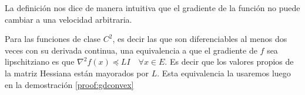 La definición nos dice de manera intuitiva que el gradiente de la función no puede cambiar a una velocidad arbitraria. %

Para las funciones de clase $C^2$, es decir las que son diferenciables al menos dos veces con su derivada continua, una equivalencia a que el gradiente de $f$ sea lipschitziano es que $\nabla^2 f(x) \preceq LI \quad \forall x \in E$. Es decir que los valores propios de la matriz Hessiana están mayorados por $L$. Esta equivalencia la usaremos luego en la demostración \ref{proof:gdconvex}

\begin{comment}
	
	\subsection{Convergencia}
	
	Sea ${a_n}$ una sucesión que converge a b, con $a_n \neq b \quad \forall n \in \mathbb{N}$.
	
	\begin{definicion}[Orden de convergencia]
	    Sean $\alpha>0$ y $\lambda>0$, si se verifica
	
	    $$\lim_{n\rightarrow \infty} \frac{|a_{n+1}-b|}{|a_n - b|^{\alpha}} = \lambda$$
	
	    Entonces decimos que la sucesión ${a_n}$ converge a b con orden de convergencia $\alpha$ y constante de error asintótica $\lambda$.
	\end{definicion}

\end{comment}

